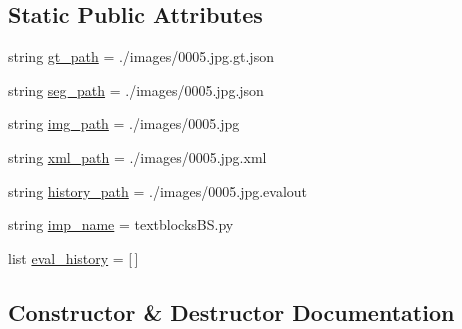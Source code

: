\subsection*{Static Public Attributes}
\begin{DoxyCompactItemize}
\item 
string \hyperlink{class_evaltest_1_1_eval_one_to_many_ae3aae1e5b90d2ed32b3ca040184efff4}{gt\+\_\+path} = \textquotesingle{}./images/0005.jpg.\+gt.\+json\textquotesingle{}
\item 
string \hyperlink{class_evaltest_1_1_eval_one_to_many_a76623a36a0d33fe95c69e7a0dbaa510d}{seg\+\_\+path} = \textquotesingle{}./images/0005.jpg.\+json\textquotesingle{}
\item 
string \hyperlink{class_evaltest_1_1_eval_one_to_many_a45410c54f9bd2090ffaa3dc68b79a1c4}{img\+\_\+path} = \textquotesingle{}./images/0005.jpg\textquotesingle{}
\item 
string \hyperlink{class_evaltest_1_1_eval_one_to_many_a8003b79be222b2106118362baf17c351}{xml\+\_\+path} = \textquotesingle{}./images/0005.jpg.\+xml\textquotesingle{}
\item 
string \hyperlink{class_evaltest_1_1_eval_one_to_many_ad3ee8a5a21993d339ffb900c8a1d8075}{history\+\_\+path} = \textquotesingle{}./images/0005.jpg.\+evalout\textquotesingle{}
\item 
string \hyperlink{class_evaltest_1_1_eval_one_to_many_a02112f02ef8b460f928634402c24abf7}{imp\+\_\+name} = \textquotesingle{}textblocks\+B\+S.\+py\textquotesingle{}
\item 
list \hyperlink{class_evaltest_1_1_eval_one_to_many_aec86437d48bbc9ab3fa798ce88bb7951}{eval\+\_\+history} = \mbox{[}$\,$\mbox{]}
\end{DoxyCompactItemize}


\subsection{Constructor \& Destructor Documentation}
\hypertarget{class_evaltest_1_1_eval_one_to_many_ab081e958b89078930d3966cbad883b6f}{}
